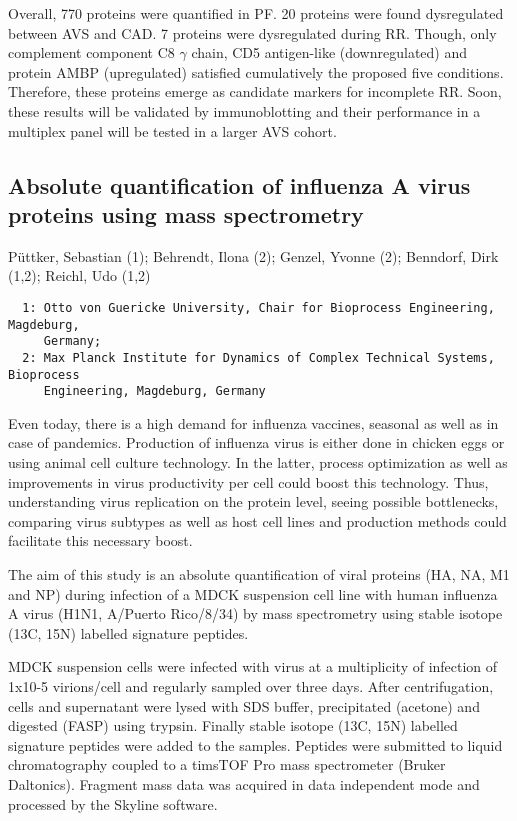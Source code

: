 {Overall, 770 proteins were quantified in PF. 20 proteins were found dysregulated between AVS and CAD. 7 proteins were dysregulated during RR. Though, only complement component C8 $\gamma$ chain, CD5 antigen-like (downregulated) and protein AMBP (upregulated) satisfied cumulatively the proposed five conditions. Therefore, these proteins emerge as candidate markers for incomplete RR. Soon, these results will be validated by immunoblotting and their performance in a multiplex panel will be tested in a larger AVS cohort. 


\subsection*{\color{eubicRed} Absolute quantification of influenza A virus proteins using mass spectrometry}
{\color{eubicGray}Püttker, Sebastian (1);
Behrendt, Ilona (2);
Genzel, Yvonne (2);
Benndorf, Dirk (1,2);
Reichl, Udo (1,2)}
{\color{eubicGray}\begin{verbatim}
  1: Otto von Guericke University, Chair for Bioprocess Engineering, Magdeburg,
     Germany;
  2: Max Planck Institute for Dynamics of Complex Technical Systems, Bioprocess
     Engineering, Magdeburg, Germany
\end{verbatim}}

Even today, there is a high demand for influenza vaccines, seasonal as well as in case of pandemics. Production of influenza virus is either done in chicken eggs or using animal cell culture technology. In the latter, process optimization as well as improvements in virus productivity per cell could boost this technology. Thus, understanding virus replication on the protein level, seeing possible bottlenecks, comparing virus subtypes as well as host cell lines and production methods could facilitate this necessary boost.

The aim of this study is an absolute quantification of viral proteins (HA, NA, M1 and NP) during infection of a MDCK suspension cell line with human influenza A virus (H1N1, A/Puerto Rico/8/34) by mass spectrometry using stable isotope (13C, 15N) labelled signature peptides.

MDCK suspension cells were infected with virus at a multiplicity of infection of 1x10-5 virions/cell and regularly sampled over three days. After centrifugation, cells and supernatant were lysed with SDS buffer, precipitated (acetone) and digested (FASP) using trypsin. Finally stable isotope (13C, 15N) labelled signature peptides were added to the samples. Peptides were submitted to liquid chromatography coupled to a timsTOF Pro mass spectrometer (Bruker Daltonics). Fragment mass data was acquired in data independent mode and processed by the Skyline software.

}
